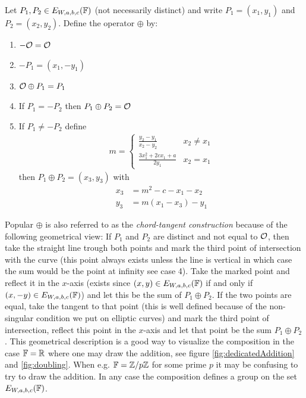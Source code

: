 Let $P_1,P_2\in E_{W,a,b,c}(\mathbb{F})$ (not  necessarily distinct) and write $P_1=(x_1,y_1)$ and $P_2=(x_2,y_2)$. Define the operator $\oplus$ by:
\begin{enumerate}[(1)]
\item $-\mathcal{O}= \mathcal{O}$
\item $-P_1=(x_1,-y_1)$
\item $\mathcal{O} \oplus P_1 = P_1$
\item If $P_1 = -P_2$ then $P_1\oplus P_2=\mathcal{O}$
\item If $P_1 \neq -P_2$ define
\begin{align*}
	m = \begin{cases} 
		\frac{y_2-y_1}{x_2-y_2} & x_2\neq x_1 \\
		\frac{3x_1^2+2cx_1+a}{2y_1} & x_2= x_1
		\end{cases}				
\end{align*}
then $P_1\oplus P_2=(x_3,y_3)$ with
\begin{align}
	x_3 &= m^2-c-x_1-x_2\label{add1}\\
	y_3 &= m(x_1-x_3)-y_1\label{add2}
\end{align}
\end{enumerate}
Popular $\oplus$ is also referred to as the \textit{chord-tangent construction} because of the following geometrical view: If $P_1$ and $P_2$ are distinct and not equal to $\mathcal{O}$, then take the straight line trough both points and mark the third point of intersection with the curve (this point always exists unless the line is vertical in which case the sum would be the point at infinity see case 4). Take the marked point and reflect it in the $x$-axis (exists since $(x,y)\in E_{W,a,b,c}(\mathbb{F})$ if and only if $(x,-y)\in E_{W,a,b,c}(\mathbb{F})$) and let this be the sum of $P_1 \oplus P_2$. If the two points are equal, take the tangent to that point (this is well defined because of the non-singular condition we put on elliptic curves) and mark the third point of intersection, reflect this point in the $x$-axis and let that point be the sum $P_1\oplus P_2$. This geometrical description is a good way to visualize the composition in the case $\mathbb{F}=\mathbb{R}$ where one may draw the addition, see figure \ref{fig:dedicatedAddition} and \ref{fig:doubling}. When e.g. $\mathbb{F}=\mathbb{Z}/p\mathbb{Z}$ for some prime $p$ it may be confusing to try to draw the addition. In any case the composition defines a group on the set $E_{W,a,b,c}(\mathbb{F})$.
